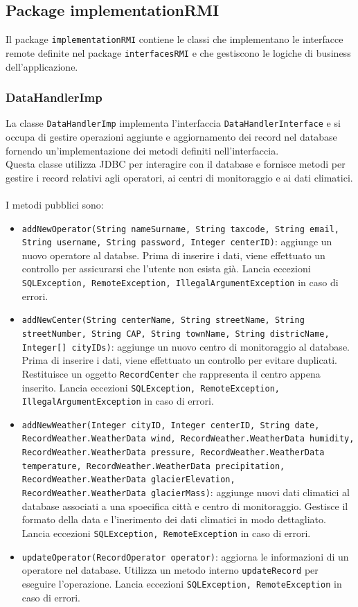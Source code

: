 \subsection{Package implementationRMI}
Il package \texttt{implementationRMI} contiene le classi che implementano le interfacce remote definite nel package \texttt{interfacesRMI} e che gestiscono le logiche di business dell'applicazione.\\


\subsubsection{DataHandlerImp}
La classe \texttt{DataHandlerImp} implementa l'interfaccia \texttt{DataHandlerInterface} e si occupa di gestire operazioni aggiunte e aggiornamento dei record nel database
fornendo un'implementazione dei metodi definiti nell'interfaccia.\\
Questa classe utilizza JDBC per interagire con il database e fornisce metodi per gestire i record relativi agli operatori, ai centri di monitoraggio e ai dati climatici.\\
\\
I metodi pubblici sono:
\begin{itemize}
      \item \texttt{addNewOperator(String nameSurname, String taxcode, String email, String username, String password, Integer centerID)}:
            aggiunge un nuovo operatore al databse. Prima di inserire i dati, viene effettuato un controllo per assicurarsi che l'utente non esista già.
            Lancia eccezioni \texttt{SQLException, RemoteException, IllegalArgumentException} in caso di errori.
      \item \texttt{addNewCenter(String centerName, String streetName, String streetNumber, String CAP, String townName, String districName, Integer[] cityIDs)}:
            aggiunge un nuovo centro di monitoraggio al database. Prima di inserire i dati, viene effettuato un controllo per evitare duplicati. Restituisce un oggetto \texttt{RecordCenter} che rappresenta il centro appena inserito.
            Lancia eccezioni \texttt{SQLException, RemoteException, IllegalArgumentException} in caso di errori.
      \item \texttt{addNewWeather(Integer cityID, Integer centerID, String date, RecordWeather.WeatherData wind, RecordWeather.WeatherData humidity, RecordWeather.WeatherData pressure, RecordWeather.WeatherData temperature, RecordWeather.WeatherData precipitation, RecordWeather.WeatherData glacierElevation, RecordWeather.WeatherData glacierMass)}:
            aggiunge nuovi dati climatici al database associati a una spoecifica città e centro di monitoraggio. Gestisce il formato della data e l'inerimento dei dati climatici in modo dettagliato.
            Lancia eccezioni \texttt{SQLException, RemoteException} in caso di errori.
      \item \texttt{updateOperator(RecordOperator operator)}:
            aggiorna le informazioni di un operatore nel database. Utilizza un metodo interno \texttt{updateRecord} per eseguire l'operazione.
            Lancia eccezioni \texttt{SQLException, RemoteException} in caso di errori.
\end{itemize}
